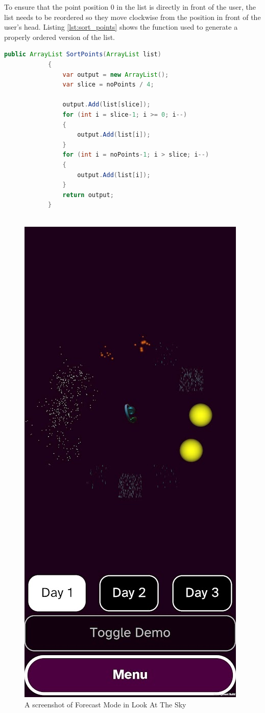 \documentclass{l4proj}
\begin{document}
To ensure that the point position 0 in the list is directly in front of the user, the list needs to be reordered so they move clockwise from the position in front of the user's head. Listing \ref{lst:sort_points} shows the function used to generate a properly ordered version of the list.

\begin{lstlisting}[language=java, float, caption={Function that takes the initial list of vectors and properly reorders them in a new list so the first point is directly ahead of the user, and the rest proceed clockwise around the circle. This ordered list is returned. }, label=lst:sort_points]
           public ArrayList SortPoints(ArrayList list)
            {
                var output = new ArrayList();
                var slice = noPoints / 4;
    
                output.Add(list[slice]);
                for (int i = slice-1; i >= 0; i--)
                {
                    output.Add(list[i]);
                }
                for (int i = noPoints-1; i > slice; i--)
                {
                    output.Add(list[i]);
                }
                return output;
            }
        

\end{lstlisting}

\begin{figure}[h!]
    \centering
    \includegraphics[width=0.3\linewidth]{images/forecast_screenshot_1.jpg}
    \caption{A screenshot of Forecast Mode in Look At The Sky}
    \label{fig:forecast_screenshot}
\end{figure}
\end{document}
